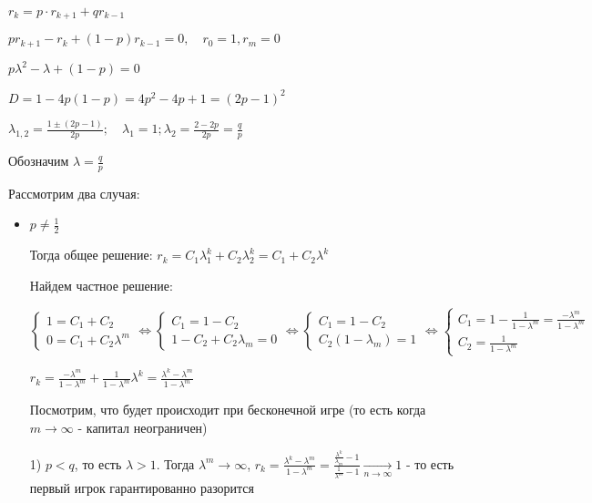 \documentclass[12pt]{article}
\begin{document}
    $r_k = p \cdot r_{k + 1} + q r_{k - 1}$

    $pr_{k + 1} - r_k + (1 - p) r_{k - 1} = 0, \quad r_0 = 1, r_{m} = 0$

    $p\lambda^2 - \lambda + (1 - p) = 0$

    $D = 1 - 4p(1 - p) = 4p^2 - 4p + 1 = (2p - 1)^2$

    $\lambda_{1, 2} = \frac{1 \pm (2p - 1)}{2p}; \quad \lambda_1 = 1; \lambda_2 = \frac{2 - 2p}{2p} = \frac{q}{p}$

    Обозначим $\lambda = \frac{q}{p}$

    Рассмотрим два случая: 

    \begin{itemize}
        \item $p \neq \frac{1}{2}$

        Тогда общее решение: $r_k = C_1 \lambda_1^k + C_2 \lambda_2^k = C_1 + C_2 \lambda^k$

        Найдем частное решение:

        $\begin{cases}
            1 = C_1 + C_2 \\
            0 = C_1 + C_2 \lambda^m
        \end{cases} \Longleftrightarrow \begin{cases}
            C_1 = 1 - C_2 \\
            1 - C_2 + C_2 \lambda_m = 0
        \end{cases} \Longleftrightarrow \begin{cases}
            C_1 = 1 - C_2 \\
            C_2 (1 - \lambda_m) = 1
        \end{cases} \Longleftrightarrow \begin{cases}
            C_1 = 1 - \frac{1}{1 - \lambda^m} = \frac{-\lambda^m}{1 - \lambda^m} \\
            C_2 = \frac{1}{1 - \lambda^m}
        \end{cases}$

        $r_k = \frac{-\lambda^m}{1 - \lambda^m} + \frac{1}{1 - \lambda^m} \lambda^k = \frac{\lambda^k - \lambda^m}{1 - \lambda^m}$

        Посмотрим, что будет происходит при бесконечной игре (то есть когда $m \to \infty$ - капитал неограничен)

        1) $p < q$, то есть $\lambda > 1$. Тогда $\lambda^m \to \infty$, $r_k = \frac{\lambda^k - \lambda^m}{1 - \lambda^m} = \frac{\frac{\lambda^k}{\lambda_m} - 1}{\frac{1}{\lambda^m} - 1} \underset{n \to \infty}{\longrightarrow} 1$ - 
        то есть первый игрок гарантированно разорится


\end{itemize}
\end{document}
